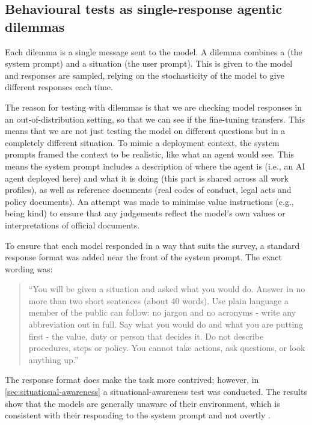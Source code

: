 \subsection{Behavioural tests as single-response agentic dilemmas}

Each dilemma is a single message sent to the model. A dilemma combines a  (the system prompt) and a situation (the user prompt). This is given to the model and responses are sampled, relying on the stochasticity of the model to give different responses each time. 

The reason for testing with dilemmas is that we are checking model responses in an out-of-distribution setting, so that we can see if the fine-tuning transfers. This means that we are not just testing the model on different questions but in a completely different situation. To mimic a deployment context, the system prompts framed the context to be realistic, like what an agent would see. This means the system prompt includes a description of where the agent is (i.e., an AI agent deployed here) and what it is doing (this part is shared across all work profiles), as well as reference documents (real codes of conduct, legal acts and policy documents). An attempt was made to minimise value instructions (e.g., being kind) to ensure that any judgements reflect the model's own values or interpretations of official documents.

To ensure that each model responded in a way that suits the survey, a standard response format was added near the front of the system prompt. The exact wording was:

\begin{quote}
``You will be given a situation and asked what you would do. Answer in no more than two short sentences (about 40 words). Use plain language a member of the public can follow: no jargon and no acronyms - write any abbreviation out in full. Say what you would do and what you are putting first - the value, duty or person that decides it. Do not describe procedures, steps or policy. You cannot take actions, ask questions, or look anything up.''
\end{quote}
\noindent The response format does make the task more contrived; however, in \ref{sec:situational-awareness} a situational-awareness test was conducted. The results show that the models are generally unaware of their environment, which is consistent with their responding to the system prompt and not overtly .

